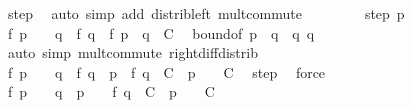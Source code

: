 \begin{isabellebody}
\ step{}\ \isamarkupfalse%
\ {\isacharparenleft}{\kern0pt}auto\ simp\ add{\isacharcolon}{\kern0pt}\ distrib{\isacharunderscore}{\kern0pt}left\ mult{\isachardot}{\kern0pt}commute{\isacharparenright}{\kern0pt}\isanewline
\ \ \isamarkupfalse%
\isanewline
\ \ \ \ \isamarkupfalse%
\ {\isacharparenleft}{\kern0pt}step{}\ p{\isacharparenright}{\kern0pt}\isanewline
\ \ \ \ \isamarkupfalse%
\ {\isachardoublequoteopen}{\isasymbar}f\ {\isacharparenleft}{\kern0pt}{\isacharparenleft}{\kern0pt}p\ {\isacharminus}{\kern0pt}\ {}{\isacharparenright}{\kern0pt}\ {\isacharasterisk}{\kern0pt}\ q{\isacharparenright}{\kern0pt}\ {\isacharplus}{\kern0pt}\ f\ q\ {\isacharminus}{\kern0pt}\ f\ {\isacharparenleft}{\kern0pt}p\ {\isacharasterisk}{\kern0pt}\ q{\isacharparenright}{\kern0pt}{\isasymbar}\ {\isasymle}\ C{\isachardoublequoteclose}\ \isamarkupfalse%
\ bound{\isacharbrackleft}{\kern0pt}of\ {\isachardoublequoteopen}p\ {\isacharasterisk}{\kern0pt}\ q\ {\isacharminus}{\kern0pt}\ q{\isachardoublequoteclose}\ {\isachardoublequoteopen}q{\isachardoublequoteclose}{\isacharbrackright}{\kern0pt}\ \isamarkupfalse%
\ {\isacharparenleft}{\kern0pt}auto\ simp{\isacharcolon}{\kern0pt}\ mult{\isachardot}{\kern0pt}commute\ right{\isacharunderscore}{\kern0pt}diff{\isacharunderscore}{\kern0pt}distrib{\isacharprime}{\kern0pt}{\isacharparenright}{\kern0pt}\isanewline
\ \ \ \ \isamarkupfalse%
\ {\isachardoublequoteopen}{\isasymbar}f\ {\isacharparenleft}{\kern0pt}{\isacharparenleft}{\kern0pt}p\ {\isacharminus}{\kern0pt}\ {}{\isacharparenright}{\kern0pt}\ {\isacharasterisk}{\kern0pt}\ q{\isacharparenright}{\kern0pt}\ {\isacharplus}{\kern0pt}\ f\ q\ {\isacharminus}{\kern0pt}\ p\ {\isacharasterisk}{\kern0pt}\ f\ q{\isasymbar}\ {\isasymle}\ C\ {\isacharplus}{\kern0pt}\ {\isacharparenleft}{\kern0pt}{\isasymbar}p{\isasymbar}\ {\isacharplus}{\kern0pt}\ {}{\isacharparenright}{\kern0pt}\ {\isacharasterisk}{\kern0pt}\ C{\isachardoublequoteclose}\ \isamarkupfalse%
\ step{}\ \isamarkupfalse%
\ force\isanewline
\ \ \ \ \isamarkupfalse%
\ {\isachardoublequoteopen}{\isasymbar}f\ {\isacharparenleft}{\kern0pt}{\isacharparenleft}{\kern0pt}p\ {\isacharminus}{\kern0pt}\ {}{\isacharparenright}{\kern0pt}\ {\isacharasterisk}{\kern0pt}\ q{\isacharparenright}{\kern0pt}\ {\isacharminus}{\kern0pt}\ {\isacharparenleft}{\kern0pt}p\ {\isacharminus}{\kern0pt}\ {}{\isacharparenright}{\kern0pt}\ {\isacharasterisk}{\kern0pt}\ f\ q{\isasymbar}\ {\isasymle}\ C\ {\isacharplus}{\kern0pt}\ {\isacharparenleft}{\kern0pt}{\isasymbar}p\ {\isacharminus}{\kern0pt}\ {}{\isasymbar}{\isacharparenright}{\kern0pt}\ {\isacharasterisk}{\kern0pt}\ C{\isachardoublequoteclose}\ \isamarkupfalse%

\end{isabellebody}
